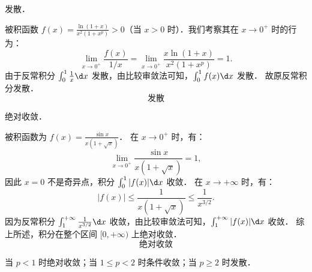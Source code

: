 \begin{solution}
     发散．

    被积函数 $f(x) = \frac{\ln(1 + x)}{x^2(1 + x^p)} > 0$（当 $x > 0$ 时）．我们考察其在 $x \to 0^+$ 时的行为：
    \begin{equation}
        \lim_{x \to 0^+} \frac{f(x)}{1/x} = \lim_{x \to 0^+} \frac{x \ln(1 + x)}{x^2(1 + x^p)} = 1.
    \end{equation}
    由于反常积分 $\int_0^1 \frac{1}{x} \d x$ 发散，由比较审敛法可知，$\int_0^1 f(x) \d x$ 发散．
    故原反常积分发散．
    \begin{equation}
        \boxed{\text{发散}}
    \end{equation}

     绝对收敛．

    被积函数为 $f(x) = \frac{\sin x}{x(1 + \sqrt{x})}$．
    在 $x \to 0^+$ 时，有：
    \begin{equation}
        \lim_{x \to 0^+} \frac{\sin x}{x(1 + \sqrt{x})} = 1,
    \end{equation}
    因此 $x = 0$ 不是奇异点，积分 $\int_0^1 |f(x)| \d x$ 收敛．
    在 $x \to +\infty$ 时，有：
    \begin{equation}
        |f(x)| \leqslant \frac{1}{x(1 + \sqrt{x})} \leqslant \frac{1}{x^{3/2}}.
    \end{equation}
    因为反常积分 $\int_1^{+\infty} \frac{1}{x^{3/2}} \d x$ 收敛，由比较审敛法可知，$\int_1^{+\infty} |f(x)| \d x$ 收敛．
    综上所述，积分在整个区间 $[0, +\infty)$ 上绝对收敛．
    \begin{equation}
        \boxed{\text{绝对收敛}}
    \end{equation}

     当 $p < 1$ 时绝对收敛；当 $1 \leqslant p < 2$ 时条件收敛；当 $p \geqslant 2$ 时发散．


\end{solution}
